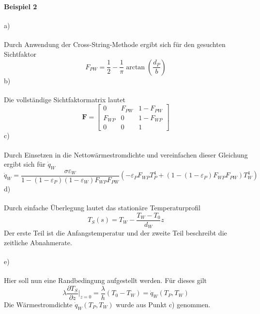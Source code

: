 \newpage
\noindent
\textbf{Beispiel 2}\\ \\
a)\\ \\
Durch Anwendung der Cross-String-Methode ergibt sich für den gesuchten Sichtfaktor
\[
	F_{PW} = \frac{1}{2} - \frac{1}{\pi}\arctan\left(\frac{d_P}{b}\right)
\]
b) \\ \\
Die vollständige Sichtfaktormatrix lautet
\[
	\textbf{F} = \begin{bmatrix}
		0 & F_{PW} & 1 - F_{PW} \\
		F_{WP} & 0 & 1 - F_{WP} \\
		0 & 0 & 1
	\end{bmatrix}
\]
c)\\ \\
Durch Einsetzen in die Nettowärmestromdichte und vereinfachen dieser Gleichung ergibt sich für $\dot{q}_W$
\[
	\dot{q}_W = \frac{\sigma \varepsilon_W}{1 - (1 - \varepsilon_P)(1 - \varepsilon_W)F_{WP}F_{PW}}\left(-\varepsilon_PF_{WP}T_P^4 + (1 - (1 - \varepsilon_P)F_{WP}F_{PW})T_W^4\right)
\]
d) \\ \\
Durch einfache Überlegung lautet das stationäre Temperaturprofil
\[
	T_S(s) = T_W- \frac{T_W - T_0}{d_W}z
\]
Der erste Teil ist die Anfangstemperatur und der zweite Teil beschreibt die zeitliche Abnahmerate. \\ \\
e)\\ \\
Hier soll nun eine Randbedingung aufgestellt werden. Für dieses gilt
\[
	\lambda\frac{\partial T_S}{\partial z}\biggl|_{z = 0} = \frac{\lambda}{h}(T_0 - T_W) = \dot{q}_W(T_P,T_W)
\]
Die Wärmestromdichte $\dot{q}_W(T_P,T_W)$ wurde aus Punkt c) genommen. \\ \\ 